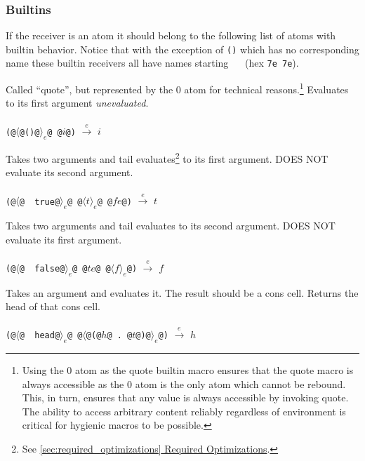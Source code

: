 \documentclass[twocolumn]{report}
\newcommand{\intralink}[2]{\hyperref[#1]{\ref*{#1} #2}}
\begin{document}
\subsubsection{Builtins}
\label{subsubsec:eval_builtin}

If the receiver is an atom it should belong to the following list of atoms with builtin behavior.
Notice that with the exception of \texttt{()} which has no corresponding name these builtin receivers all have names starting \texttt{~~} (hex \texttt{7e 7e}).

\begin{description}[leftmargin=1.5cm,labelwidth=1.3cm]
\item [\texttt{()}]
Called ``quote'', but represented by the $0$ atom for technical reasons.\footnote{Using the $0$ atom as the quote builtin macro ensures that the quote macro is always accessible as the $0$ atom is the only atom which cannot be rebound. This, in turn, ensures that any value is always accessible by invoking quote. The ability to access arbitrary content reliably regardless of environment is critical for hygienic macros to be possible.}
Evaluates to its first argument \emph{unevaluated}. \\
\\
\texttt{(@$\langle$@()@$\rangle_{e}$@ @$i$@)} $\xrightarrow{e}$ $i$

\item [\texttt{~~true}]
Takes two arguments and tail evaluates\footnote{See \intralink{sec:required_optimizations}{Required Optimizations}.} to its first argument. DOES NOT evaluate its second argument. \\
\\
\texttt{(@$\langle$@~~true@$\rangle_{e}$@ @$\langle t \rangle_{e}$@ @$fe$@)} $\xrightarrow{e}$ $t$

\item [\texttt{~~false}]
Takes two arguments and tail evaluates to its second argument. DOES NOT evaluate its first argument. \\
\\
\texttt{(@$\langle$@~~false@$\rangle_{e}$@ @$te$@ @$\langle f \rangle_{e}$@)} $\xrightarrow{e}$ $f$

\item [\texttt{~~head}]
Takes an argument and evaluates it.
The result should be a cons cell.
Returns the head of that cons cell. \\
\\
\texttt{(@$\langle$@~~head@$\rangle_{e}$@ @$\langle$@(@$h$@ . @$t$@)@$\rangle_{e}$@)} $\xrightarrow{e}$ $h$


\end{description}
\end{document}

